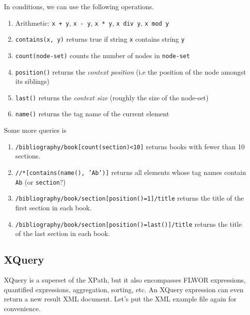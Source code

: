 \documentclass{article}
\begin{document}
    \begin{definition} 
      In conditions, we can use the following operations. 
      \begin{enumerate}
        \item Arithmetic: \texttt{x + y}, \texttt{x - y}, \texttt{x * y}, \texttt{x div y}, \texttt{x mod y} 
        \item \texttt{contains(x, y)} returns true if string \texttt{x} contains string \texttt{y} 
        \item \texttt{count(node-set)} counts the number of nodes in \texttt{node-set} 
        \item \texttt{position()} returns the \textit{context position} (i.e the position of the node amongst its siblings) 
        \item \texttt{last()} returns the \textit{context size} (roughly the size of the node-set)
        \item \texttt{name()} returns the tag name of the current element
      \end{enumerate}
    \end{definition}

    \begin{example}
      Some more queries is 
      \begin{enumerate}
        \item \texttt{/bibliography/book[count(section)<10]} returns books with fewer than 10 sections. 
        \item \texttt{//*[contains(name(), 'Ab')]} returns all elements whose tag names contain \texttt{Ab} (or \texttt{section}?) 
        \item \texttt{/bibliography/book/section[position()=1]/title} returns the title of the first section in each book. 
        \item \texttt{/bibliography/book/section[position()=last()]/title} returns the title of the last section in each book.
      \end{enumerate}
    \end{example}

  \subsection{XQuery}
    
    XQuery is a superset of the XPath, but it also encompasses FLWOR  expressions, quantified expressions, aggregation, sorting, etc. An XQuery expression can even return a new result XML document. Let's put the XML example file again for convenience. 
\end{document}
